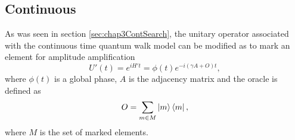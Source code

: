 \documentclass[../../dissertation.tex]{subfiles}
\begin{document}
\subsection{Continuous}
As was seen in section \ref{sec:chap3ContSearch}, the unitary operator
associated with the continuous time quantum walk model can be modified as to
mark an element for amplitude amplification
\begin{equation}
	U'(t) = e^{iH't} = \phi(t)e^{-i(\gamma A+O)t},
	\label{eq:qiskitU'}
\end{equation}
where $\phi(t)$ is a global phase, $A$ is the adjacency matrix and the oracle
is defined as 
\begin{equation}
	O = \sum_{m \in M} \ket{m}\bra{m},
\end{equation}
where $M$ is the set of marked elements.\par
\end{document}
